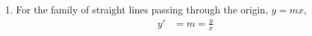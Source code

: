 \begin{enumerate}
\begin{enumerate}
              \item For the family of straight lines passing through the origin, $ y = mx $,
                    \begin{align}
                        y' & = m = \frac{y}{x}
                    \end{align}


\end{enumerate}
\end{enumerate}
